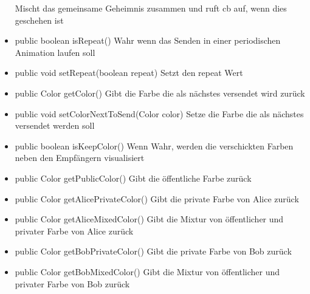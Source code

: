 \documentclass{article}
\begin{document}
\begin{itemize}
               Mischt das gemeinsame Geheimnis zusammen und ruft cb auf, wenn dies geschehen ist\newline
           \item public boolean isRepeat() \newline
               Wahr wenn das Senden in einer periodischen Animation laufen soll\newline
           \item public void setRepeat(boolean repeat) \newline
               Setzt den repeat Wert\newline
           \item public Color getColor() \newline
               Gibt die Farbe die als nächstes versendet wird zurück\newline
           \item public void setColorNextToSend(Color color) \newline
               Setze die Farbe die als nächstes versendet werden soll\newline
           \item public boolean isKeepColor() \newline
               Wenn Wahr, werden die verschickten Farben neben den Empfängern visualisiert\newline
           \item public Color getPublicColor() \newline
               Gibt die öffentliche Farbe zurück\newline
           \item public Color getAlicePrivateColor() \newline
               Gibt die private Farbe von Alice zurück\newline
           \item public Color getAliceMixedColor() \newline
               Gibt die Mixtur von öffentlicher und privater Farbe von Alice zurück\newline
           \item public Color getBobPrivateColor() \newline
               Gibt die private Farbe von Bob zurück\newline
           \item public Color getBobMixedColor() \newline
               Gibt die Mixtur von öffentlicher und privater Farbe von Bob zurück\newline
           \end{itemize}
\end{document}
